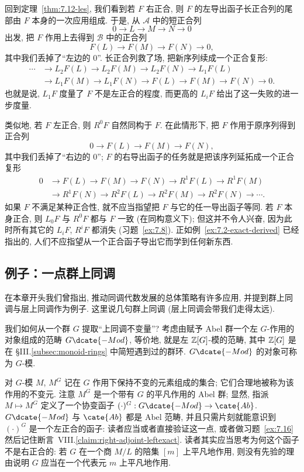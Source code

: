回到定理~\ref{thm:7.12-les}, 我们看到若 $F$ 右正合, 则 $F$ 的左导出函子长正合列的尾部由 $F$ 本身的一次应用组成. 于是, 从 $\mathcal{A}$ 中的短正合列
\[
0\to L\to M\to N\to 0
\]
出发, 把 $F$ 作用上去得到 $\mathcal{B}$ 中的正合列
\[
F(L)\to F(M)\to F(N)\to 0,
\]
其中我们丢掉了``左边的 $0$''. 长正合列救了场, 把新序列续成一个正合复形:
\[
\begin{aligned}
\cdots&\to L_2 F(L)\to L_2 F(M)\to L_2 F(N)\to L_1 F(L)\\
&\to L_1 F(M)\to L_1 F(N)\to F(L)\to F(M)\to F(N)\to 0.
\end{aligned}
\]
也就是说, $L_1 F$ 度量了 $F$ 不是左正合的程度, 而更高的 $L_i F$ 给出了这一失败的进一步度量.

类似地, 若 $F$ 左正合, 则 $R^0 F$ 自然同构于 $F$. 在此情形下, 把 $F$ 作用于原序列得到正合列
\[
0\to F(L)\to F(M)\to F(N),
\]
其中我们丢掉了``右边的 $0$''; $F$ 的右导出函子的任务就是把该序列延拓成一个正合复形
\[
\begin{aligned}
0&\to F(L)\to F(M)\to F(N)\to R^1 F(L)\to R^1 F(M)\\
&\to R^1 F(N)\to R^2 F(L)\to R^2 F(M)\to R^2 F(N)\to\cdots.
\end{aligned}
\]
如果 $F$ 不满足某种正合性, 就不应当指望把 $F$ 与它的任一导出函子等同. 若 $F$ 本身正合, 则 $L_0 F$ 与 $R^0 F$ 都与 $F$ 一致 (在同构意义下); 但这并不令人兴奋, 因为此时所有其它的 $L_i F$, $R^i F$ 都消失 (习题~\ref{ex:7.8}). 正如例~\ref{ex:7.2-exact-derived} 已经指出的, 人们不应指望从一个正合函子导出它而学到任何新东西.

\subsection{例子：一点群上同调}
\label{subsec:7.6-group-cohomology}

在本章开头我们曾指出, 推动同调代数发展的总体策略有许多应用, 并提到群上同调与层上同调作为例子. 这里说几句群上同调 (层上同调会带我们走得太远).

我们如何从一个群 $G$ 提取``上同调不变量''? 考虑由赋予 Abel 群一个左 $G$-作用的对象组成的范畴 $G\dcate{-Mod}$, 等价地, 就是左 $\mathbb{Z}[G]$-模的范畴, 其中 $\mathbb{Z}[G]$ 是在 §III.\ref{subsec:monoid-rings} 中简短遇到过的群环. $G\dcate{-Mod}$ 的对象可称为 $G$-模.

对 $G$-模 $M$, $M^G$ 记在 $G$ 作用下保持不变的元素组成的集合; 它们合理地被称为该作用的不变元. 注意 $M^G$ 是一个带有 $G$ 的平凡作用的 Abel 群; 显然, 指派 $M\mapsto M^G$ 定义了一个协变函子 $(\cdot)^G:G\dcate{-Mod}\to\cate{Ab}$. $G\dcate{-Mod}$ 与 $\cate{Ab}$ 都是 Abel 范畴, 并且只需片刻就能意识到 $(\cdot)^G$ 是一个左正合的函子: 读者应当或者直接验证这一点, 或者做习题~\ref{ex:7.16} 然后记住断言~VIII.\ref{claim:right-adjoint-leftexact}. 读者其实应当思考为何这个函子不是右正合的: 若 $G$ 在一个商 $M/L$ 的陪集 $[m]$ 上平凡地作用, 则没有先验的理由说明 $G$ 应当在一个代表元 $m$ 上平凡地作用.

